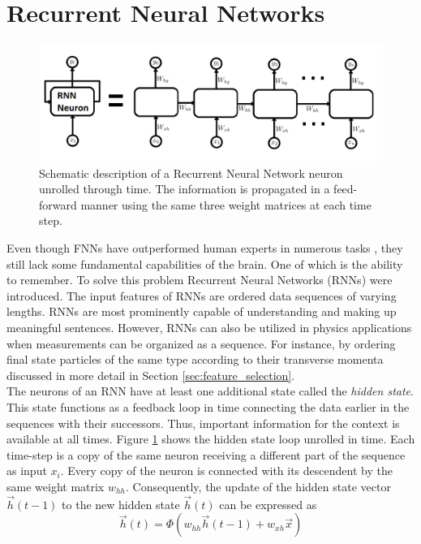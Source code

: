 \section{Recurrent Neural Networks}
\label{sec:RNN}
\begin{figure}[H]
\centering
\includegraphics[scale=0.58]{figs/Unrolling.png}
\caption{Schematic description of a Recurrent Neural Network neuron unrolled through time. The information is propagated in a feed-forward manner using the same three weight matrices at each time step.}
\label{fig:unrolling}
\end{figure}
Even though FNNs have outperformed human experts in numerous tasks \cite{NNbH1,NNbH2,NNbH3}, they still lack some fundamental capabilities of the brain. One of which is the ability to remember. To solve this problem Recurrent Neural Networks (RNNs) were introduced. The input features of RNNs are ordered data sequences of varying lengths. RNNs are most prominently capable of understanding and making up meaningful sentences. However, RNNs can also be utilized in physics applications when measurements can be organized as a sequence. For instance, by ordering final state particles of the same type according to their transverse momenta discussed in more detail in Section \ref{sec:feature_selection}. \\
The neurons of an RNN have at least one additional state called the \textit{hidden state}. This state functions as a feedback loop in time connecting the data earlier in the sequences with their successors.
Thus, important information for the context is available at all times. Figure \ref{fig:unrolling} shows the hidden state loop unrolled in time. Each time-step is a copy of the same neuron receiving a different part of the sequence as input $x_i$. Every copy of the neuron is connected with its descendent by the same weight matrix $w_{hh}$. Consequently, the update of the hidden state vector $\vec{h}(t-1)$ to the new hidden state $\vec{h}(t)$ can be expressed as
\begin{equation}
\vec{h}(t) = \Phi(w_{hh} \vec{h}(t-1) + w_{xh} \vec{x})
\end{equation}
